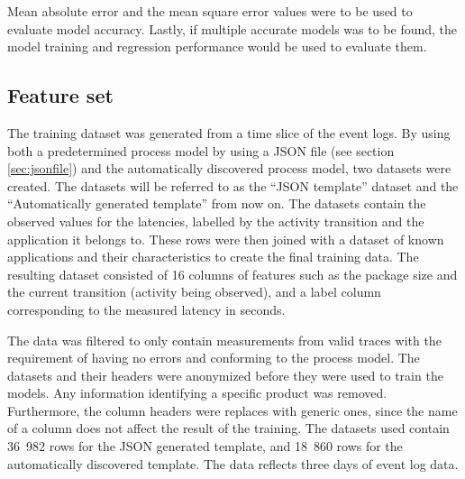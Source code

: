 Mean absolute error and the mean square error values were to be used to evaluate model accuracy.
Lastly, if multiple accurate models was to be found, the model training and regression performance would be used to evaluate them.

\subsection{Feature set}
\label{sec:featureset}

The training dataset was generated from a time slice of the event logs. 
By using both a predetermined process model by using a JSON file (see section \ref{sec:jsonfile}) and the automatically discovered process model, two datasets were created. 
The datasets will be referred to as the ``JSON template'' dataset and the ``Automatically generated template'' from now on.
The datasets contain the observed values for the latencies, labelled by the activity transition and the application it belongs to.
These rows were then joined with a dataset of known applications and their characteristics to create the final training data.
The resulting dataset consisted of 16 columns of features such as the package size and the current transition (activity being observed), and a label column corresponding to the measured latency in seconds. 

The data was filtered to only contain measurements from valid traces with the requirement of having no errors and conforming to the process model.
The datasets and their headers were anonymized before they were used to train the models.
Any information identifying a specific product was removed.
Furthermore, the column headers were replaces with generic ones, since the name of a column does not affect the result of the training.
The datasets used contain 36~982 rows for the JSON generated template, and 18~860 rows for the automatically discovered template.
The data reflects three days of event log data.

